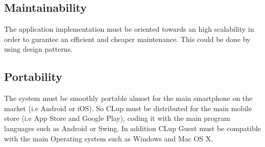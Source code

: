 \subsection{Maintainability}
The application implementation must be oriented towards an high scalability in order to gurantee an efficient and cheaper maintenance. This could be done by using design patterns.
\subsection{Portability}
The system must be smoothly portable almost for the main smartphone on the market (i.e Android or iOS). So CLup must be distributed for the main mobile store (i.e App Store and Google Play), coding it with the main program languages such as Android or Swing. In addition CLup Guest
must be compatible with the main Operating system such as Windows and Mac OS X. 